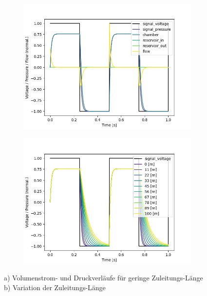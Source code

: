 \documentclass[fontsize=12pt, a4paper]{scrartcl}
\begin{document}
\begin{figure}[H]
	\centering
	\begin{subfigure}[H]{0.48\textwidth}
		\includegraphics[width=\textwidth, valign=t]{bilder/tubelength/tl_in_branch_singlesweep.png}
	\end{subfigure}
	\begin{subfigure}[H]{0.48\textwidth}
		\includegraphics[width=\textwidth, valign=t]{bilder/tubelength/tl_in_branch_multisweep.png}
	\end{subfigure}
    \caption{a) Volumenstrom- und Druckverläufe für geringe Zuleitungs-Länge b) Variation der Zuleitungs-Länge}
    \label{fig:zuleitungen}
\end{figure}
\end{document}
